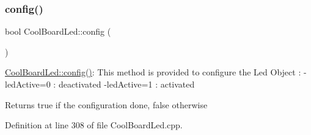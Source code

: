 \subsubsection{\texorpdfstring{config()}{config()}}
{\footnotesize\ttfamily bool Cool\+Board\+Led\+::config (\begin{DoxyParamCaption}{ }\end{DoxyParamCaption})}

\hyperlink{class_cool_board_led_a1b60e5e30bea96c49ed62ed1bf1ffc8b}{Cool\+Board\+Led\+::config()}\+: This method is provided to configure the Led Object \+: -\/led\+Active=0 \+: deactivated -\/led\+Active=1 \+: activated \begin{DoxyReturn}{Returns}
true if the configuration done, false otherwise 
\end{DoxyReturn}


Definition at line 308 of file Cool\+Board\+Led.\+cpp.


